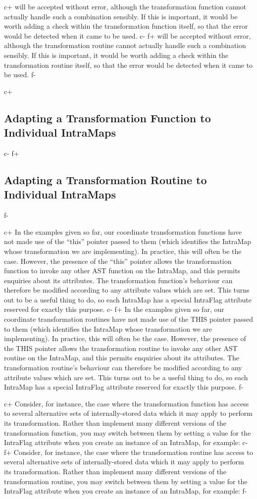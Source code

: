 \documentclass[twoside,11pt]{article}
\begin{document}
c+
will be accepted without error, although the transformation function
cannot actually handle such a combination sensibly. If this is
important, it would be worth adding a check within the transformation
function itself, so that the error would be detected when it came to
be used.
c-
f+
will be accepted without error, although the transformation routine
cannot actually handle such a combination sensibly. If this is
important, it would be worth adding a check within the transformation
routine itself, so that the error would be detected when it came to be
used.
f-

c+
\subsection{\label{ss:intraflag}Adapting a Transformation Function to Individual IntraMaps}
c-
f+
\subsection{\label{ss:intraflag}Adapting a Transformation Routine to Individual IntraMaps}
f-

c+
In the examples given so far, our coordinate transformation functions
have not made use of the ``this'' pointer passed to them (which
identifies the IntraMap whose transformation we are implementing). In
practice, this will often be the case. However, the presence of the
``this'' pointer allows the transformation function to invoke any
other AST function on the IntraMap, and this permits enquiries about
its attributes. The transformation function's behaviour can therefore
be modified according to any attribute values which are set. This
turns out to be a useful thing to do, so each IntraMap has a special
IntraFlag attribute reserved for exactly this purpose.
c-
f+
In the examples given so far, our coordinate transformation routines
have not made use of the THIS pointer passed to them (which identifies
the IntraMap whose transformation we are implementing). In practice,
this will often be the case. However, the presence of the THIS pointer
allows the transformation routine to invoke any other AST routine on
the IntraMap, and this permits enquiries about its attributes. The
transformation routine's behaviour can therefore be modified according
to any attribute values which are set. This turns out to be a useful
thing to do, so each IntraMap has a special IntraFlag attribute reserved
for exactly this purpose.
f-

c+
Consider, for instance, the case where the transformation function has
access to several alternative sets of internally-stored data which it
may apply to perform its transformation. Rather than implement many
different versions of the transformation function, you may switch
between them by setting a value for the IntraFlag attribute when you
create an instance of an IntraMap, for example:
c-
f+
Consider, for instance, the case where the transformation routine has
access to several alternative sets of internally-stored data which it
may apply to perform its transformation. Rather than implement many
different versions of the transformation routine, you may switch
between them by setting a value for the IntraFlag attribute when you
create an instance of an IntraMap, for example:
f-
\end{document}
